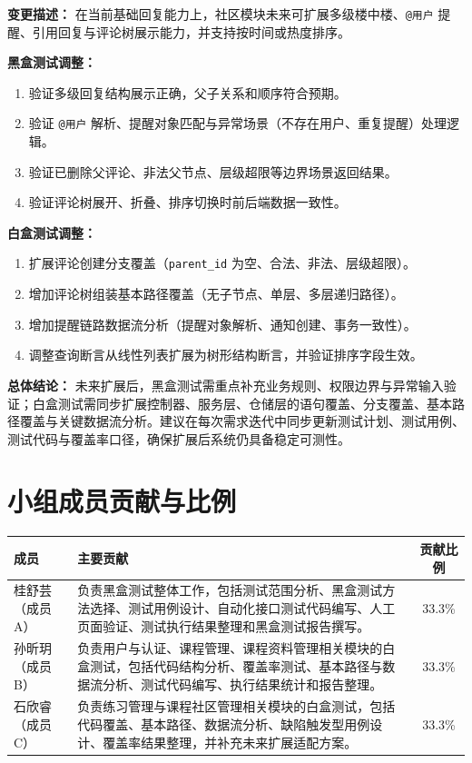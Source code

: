 \documentclass[12pt,a4paper]{ctexart}
\begin{document}
\textbf{变更描述：}
在当前基础回复能力上，社区模块未来可扩展多级楼中楼、\texttt{@用户} 提醒、引用回复与评论树展示能力，并支持按时间或热度排序。

\textbf{黑盒测试调整：}
\begin{enumerate}
  \item 验证多级回复结构展示正确，父子关系和顺序符合预期。
  \item 验证 \texttt{@用户} 解析、提醒对象匹配与异常场景（不存在用户、重复提醒）处理逻辑。
  \item 验证已删除父评论、非法父节点、层级超限等边界场景返回结果。
  \item 验证评论树展开、折叠、排序切换时前后端数据一致性。
\end{enumerate}

\textbf{白盒测试调整：}
\begin{enumerate}
  \item 扩展评论创建分支覆盖（\texttt{parent\_id} 为空、合法、非法、层级超限）。
  \item 增加评论树组装基本路径覆盖（无子节点、单层、多层递归路径）。
  \item 增加提醒链路数据流分析（提醒对象解析、通知创建、事务一致性）。
  \item 调整查询断言从线性列表扩展为树形结构断言，并验证排序字段生效。
\end{enumerate}

\textbf{总体结论：}
未来扩展后，黑盒测试需重点补充业务规则、权限边界与异常输入验证；白盒测试需同步扩展控制器、服务层、仓储层的语句覆盖、分支覆盖、基本路径覆盖与关键数据流分析。建议在每次需求迭代中同步更新测试计划、测试用例、测试代码与覆盖率口径，确保扩展后系统仍具备稳定可测性。

\section{小组成员贡献与比例}

\begin{center}
\begin{tabular}{|p{1.8cm}|p{8.8cm}|c|}
\hline
\textbf{成员} & \textbf{主要贡献} & \textbf{贡献比例} \\
\hline
桂舒芸（成员 A） & 负责黑盒测试整体工作，包括测试范围分析、黑盒测试方法选择、测试用例设计、自动化接口测试代码编写、人工页面验证、测试执行结果整理和黑盒测试报告撰写。 & 33.3\% \\
\hline
孙昕玥（成员 B） & 负责用户与认证、课程管理、课程资料管理相关模块的白盒测试，包括代码结构分析、覆盖率测试、基本路径与数据流分析、测试代码编写、执行结果统计和报告整理。 & 33.3\% \\
\hline
石欣睿（成员 C） & 负责练习管理与课程社区管理相关模块的白盒测试，包括代码覆盖、基本路径、数据流分析、缺陷触发型用例设计、覆盖率结果整理，并补充未来扩展适配方案。 & 33.3\% \\
\hline
\end{tabular}
\end{center}
\end{document}
